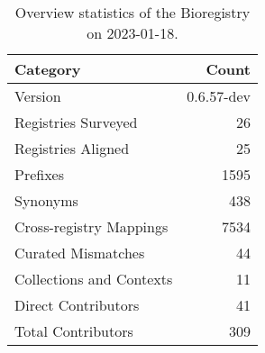 \begin{table}
\centering
\caption{Overview statistics of the Bioregistry on 2023-01-18.}
\label{tab:bioregistry-summary}
\begin{tabular}{lr}
\toprule
                Category &      Count \\
\midrule
                 Version & 0.6.57-dev \\
     Registries Surveyed &         26 \\
      Registries Aligned &         25 \\
                Prefixes &       1595 \\
                Synonyms &        438 \\
 Cross-registry Mappings &       7534 \\
      Curated Mismatches &         44 \\
Collections and Contexts &         11 \\
     Direct Contributors &         41 \\
      Total Contributors &        309 \\
\bottomrule
\end{tabular}
\end{table}
